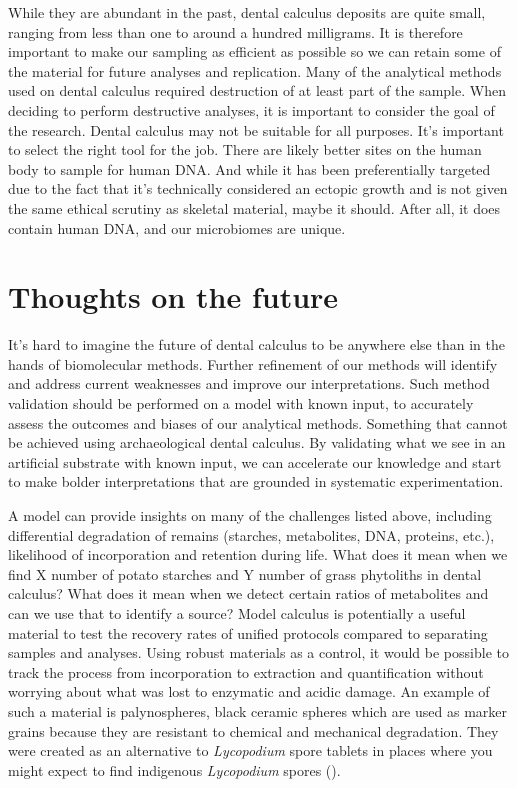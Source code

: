 \documentclass[
  b5paper,
]{book}
\begin{document}
While they are abundant in the past, dental calculus deposits are quite
small, ranging from less than one to around a hundred milligrams. It is
therefore important to make our sampling as efficient as possible so we
can retain some of the material for future analyses and replication.
Many of the analytical methods used on dental calculus required
destruction of at least part of the sample. When deciding to perform
destructive analyses, it is important to consider the goal of the
research. Dental calculus may not be suitable for all purposes. It's
important to select the right tool for the job. There are likely better
sites on the human body to sample for human DNA. And while it has been
preferentially targeted due to the fact that it's technically considered
an ectopic growth and is not given the same ethical scrutiny as skeletal
material, maybe it should. After all, it does contain human DNA, and our
microbiomes are unique.

\section{Thoughts on the future}\label{thoughts-on-the-future}

It's hard to imagine the future of dental calculus to be anywhere else
than in the hands of biomolecular methods. Further refinement of our
methods will identify and address current weaknesses and improve our
interpretations. Such method validation should be performed on a model
with known input, to accurately assess the outcomes and biases of our
analytical methods. Something that cannot be achieved using
archaeological dental calculus. By validating what we see in an
artificial substrate with known input, we can accelerate our knowledge
and start to make bolder interpretations that are grounded in systematic
experimentation.

A model can provide insights on many of the challenges listed above,
including differential degradation of remains (starches, metabolites,
DNA, proteins, etc.), likelihood of incorporation and retention during
life. What does it mean when we find X number of potato starches and Y
number of grass phytoliths in dental calculus? What does it mean when we
detect certain ratios of metabolites and can we use that to identify a
source? Model calculus is potentially a useful material to test the
recovery rates of unified protocols compared to separating samples and
analyses. Using robust materials as a control, it would be possible to
track the process from incorporation to extraction and quantification
without worrying about what was lost to enzymatic and acidic damage. An
example of such a material is palynospheres, black ceramic spheres which
are used as marker grains because they are resistant to chemical and
mechanical degradation. They were created as an alternative to
\emph{Lycopodium} spore tablets in places where you might expect to find
indigenous \emph{Lycopodium} spores
().
\end{document}
